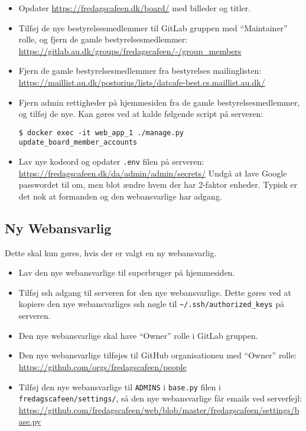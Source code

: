 \begin{itemize}
    \item Opdater \url{https://fredagscafeen.dk/board/} med billeder og titler.
    \item Tilføj de nye bestyrelsesmedlemmer til GitLab gruppen
    med ``Maintainer'' rolle, og fjern de gamle bestyrelsesmedlemmer:\\
    {\small\url{https://gitlab.au.dk/groups/fredagscafeen/-/group_members}}
    \item Fjern de gamle bestyrelsesmedlemmer fra bestyrelses mailinglisten:\\
    {\small\url{https://maillist.au.dk/postorius/lists/datcafe-best.cs.maillist.au.dk/}}
    \item Fjern admin rettigheder på hjemmesiden fra de gamle bestyrelsesmedlemmer, og tilføj de nye.
    Kan gøres ved at kalde følgende script på serveren:
    {\small\begin{verbatim}
$ docker exec -it web_app_1 ./manage.py update_board_member_accounts\end{verbatim}}
    \item Lav nye kodeord og opdater \texttt{.env} filen på serveren:\\
    {\small\url{https://fredagscafeen.dk/da/admin/admin/secrets/}}
    Undgå at lave Google passwordet til  om, men blot ændre hvem der har 
    2-faktor enheder. Typisk er det nok at formanden og den webansvarlige har adgang.
\end{itemize}

\subsection{Ny Webansvarlig}
\label{sec:ny-webansvarlig}

Dette skal kun gøres, hvis der er valgt en ny webansvarlig.
\begin{itemize}
    \item Lav den nye webansvarlige til superbruger på hjemmesiden.
    \item Tilføj ssh adgang til serveren for den nye webansvarlige.
    Dette gøres ved at kopiere den nye webansvarliges ssh nøgle til 
    \texttt{\textasciitilde/.ssh/authorized\_keys} på serveren.
    \item Den nye webansvarlige skal have ``Owner'' rolle i GitLab gruppen.
    \item Den nye webansvarlige tilføjes til GitHub organisationen med ``Owner'' rolle:\\
    {\small\url{https://github.com/orgs/fredagscafeen/people}}
    \item Tilføj den nye webansvarlige til \texttt{ADMINS} i \texttt{base.py} filen i\\
    \texttt{fredagscafeen/settings/}, så den nye webansvarlige får emails ved serverfejl:\\
    {\small\url{https://github.com/fredagscafeen/web/blob/master/fredagscafeen/settings/base.py}}
\end{itemize}
